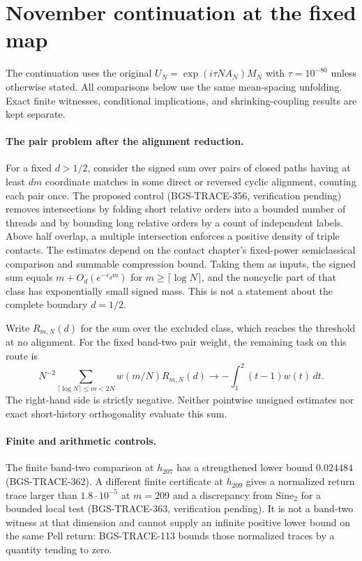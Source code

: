 \section{November continuation at the fixed map}
\label{sec:november-fixed-map-continuation}

The continuation uses the original \(U_N=\exp(i\tau N A_N)M_N\) with
\(\tau=10^{-80}\) unless otherwise stated. All comparisons below use the
same mean-spacing unfolding. Exact finite witnesses, conditional
implications, and shrinking-coupling results are kept separate.

\paragraph{The pair problem after the alignment reduction.}
For a fixed \(d>1/2\), consider the signed sum over pairs of closed paths
having at least \(dm\) coordinate matches in some direct or reversed
cyclic alignment, counting each pair once. The proposed control
(BGS-TRACE-356, verification pending) removes intersections by folding
short relative orders into a bounded number of threads and by bounding
long relative orders by a count of independent labels. Above half
overlap, a multiple intersection enforces a positive density of triple
contacts. The estimates depend on the contact chapter's fixed-power
semiclassical comparison and summable compression bound. Taking them
as inputs, the signed sum equals \(m+O_d(e^{-c_d m})\) for
\(m\ge\lceil\log N\rceil\), and the noncyclic part of that class has
exponentially small signed mass. This is not a statement about the
complete boundary \(d=1/2\).

Write \(R_{m,N}(d)\) for the sum over the excluded class, which reaches
the threshold at no alignment. For the fixed band-two pair weight,
the remaining task on this route is
\[
  N^{-2}\sum_{\lceil\log N\rceil\le m<2N}w(m/N)R_{m,N}(d)
  \longrightarrow -\int_1^2(t-1)w(t)\,dt .
\]
The right-hand side is strictly negative. Neither pointwise unsigned
estimates nor exact short-history orthogonality evaluate this sum.

\paragraph{Finite and arithmetic controls.}
The finite band-two comparison at \(h_{207}\) has a strengthened lower
bound \(0.024484\) (BGS-TRACE-362). A different finite certificate at
\(h_{209}\) gives a normalized return trace larger than
\(1.8\cdot10^{-5}\) at \(m=209\) and a discrepancy from Sine\(_2\) for a
bounded local test (BGS-TRACE-363, verification pending). It is not
a band-two witness at that dimension and cannot supply an infinite
positive lower bound on the same Pell return: BGS-TRACE-113 bounds
those normalized traces by a quantity tending to zero.

